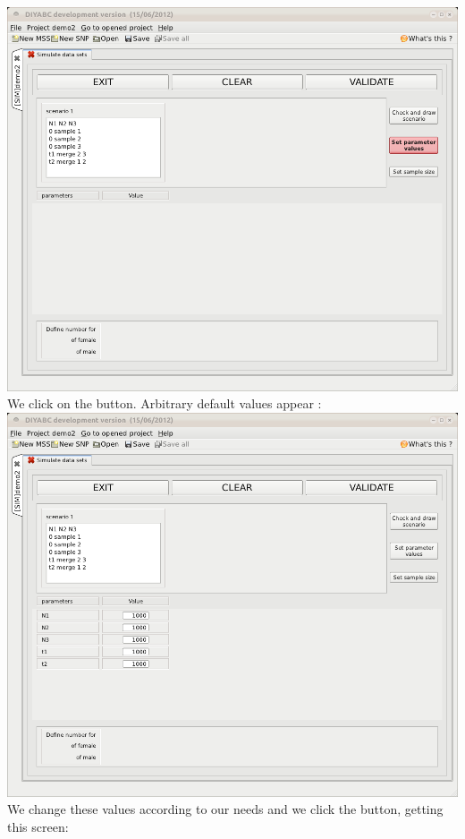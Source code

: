 \includegraphics[scale=0.33]{gui_pictures/Capture-DIYABC-66.png} \\

We click on the   button. Arbitrary default values appear :\\

\includegraphics[scale=0.33]{gui_pictures/Capture-DIYABC-67.png} \\

We change these values according to our needs and we click the  button, getting this screen:\\

